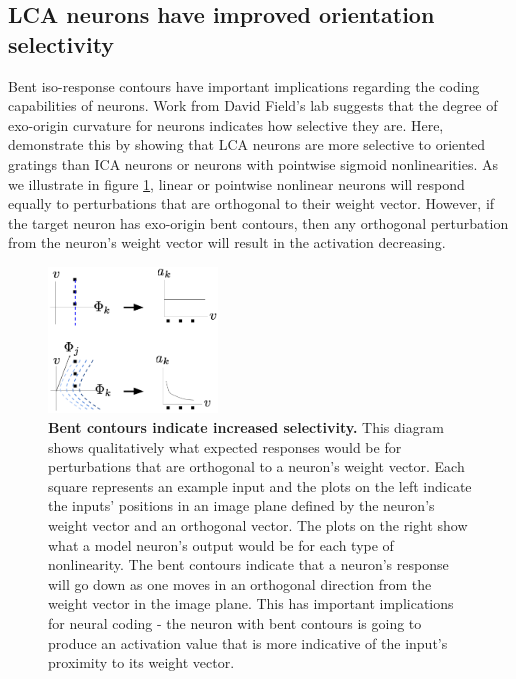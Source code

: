 \subsection{LCA neurons have improved orientation selectivity}
Bent iso-response contours have important implications regarding the coding capabilities of neurons.
Work from David Field's lab \parencite{golden2016conjectures, vilankar2017selectivity} suggests that the degree of exo-origin curvature for neurons indicates how selective they are.
Here, demonstrate this by showing that LCA neurons are more selective to oriented gratings than ICA neurons or neurons with pointwise sigmoid nonlinearities.
As we illustrate in figure \ref{fig:ch4_lca_selectivity_diagram}, linear or pointwise nonlinear neurons will respond equally to perturbations that are orthogonal to their weight vector.
However, if the target neuron has exo-origin bent contours, then any orthogonal perturbation from the neuron's weight vector will result in the activation decreasing.

\begin{figure}[h]
    \centering
    \includegraphics[width=0.4\textwidth]{figures/lca_selectivity_diagram.png}
    \caption{\textbf{Bent contours indicate increased selectivity.} This diagram shows qualitatively what expected responses would be for perturbations that are orthogonal to a neuron's weight vector. Each square represents an example input and the plots on the left indicate the inputs' positions in an image plane defined by the neuron's weight vector and an orthogonal vector. The plots on the right show what a model neuron's output would be for each type of nonlinearity. The bent contours indicate that a neuron's response will go down as one moves in an orthogonal direction from the weight vector in the image plane. This has important implications for neural coding - the neuron with bent contours is going to produce an activation value that is more indicative of the input's proximity to its weight vector.}
    \label{fig:ch4_lca_selectivity_diagram}
\end{figure}

